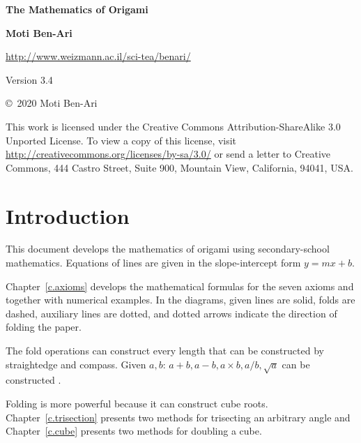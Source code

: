 
\thispagestyle{empty}

\begin{center}
\textbf{\LARGE The Mathematics of Origami}

\bigskip
\bigskip

\textbf{\Large Moti Ben-Ari}

\bigskip
\bigskip

\url{http://www.weizmann.ac.il/sci-tea/benari/}

\bigskip
\bigskip

Version 3.4
\end{center}

\vfill

\begin{small}
\begin{center}
\copyright{}\ 2020 Moti Ben-Ari
\end{center}

This work is licensed under the Creative Commons Attribution-ShareAlike 3.0 Unported License. To view a copy of this license, visit \url{http://creativecommons.org/licenses/by-sa/3.0/} or send a letter to Creative Commons, 444 Castro Street, Suite 900, Mountain View, California, 94041, USA.
\end{small}

\tableofcontents



\chapter{Introduction}\label{c.introduction}

This document develops the mathematics of origami using secondary-school mathematics. Equations of lines are given in the slope-intercept form $y=mx+b$.

Chapter~\ref{c.axioms} develops the mathematical formulas for the seven axioms and together with numerical examples. In the diagrams, given lines are solid, folds are dashed, auxiliary lines are dotted, and dotted arrows indicate the direction of folding the paper.

The fold operations can construct every length that can be constructed by straightedge and compass. Given $a,b$: $a+b, a-b, a\times b, a/b, \sqrt{a}$ can be constructed \cite[Chapter~4]{hwa}.

Folding is more powerful because it can construct cube roots. Chapter~\ref{c.trisection} presents two methods for trisecting an arbitrary angle and Chapter~\ref{c.cube} presents two methods for doubling a cube.

